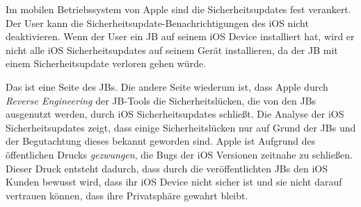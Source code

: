  Im mobilen Betriebssystem von Apple sind die Sicherheitsupdates fest verankert. Der User kann die Sicherheitsupdate-Benachrichtigungen des iOS nicht deaktivieren. Wenn der User ein JB auf seinem iOS Device installiert hat, wird er nicht alle iOS Sicherheitsupdates auf seinem Gerät installieren, da der JB mit einem Sicherheitsupdate verloren gehen würde.\par 
Das ist eine Seite des JBs. Die andere Seite wiederum ist, dass Apple durch \textit{\glqq Reverse Engineering\grqq{}} der JB-Tools die Sicherheitslücken, die von den JBs ausgenutzt werden, durch iOS Sicherheitsupdates schließt. Die Analyse der iOS Sicherheitsupdates zeigt, dass einige Sicherheitslücken nur auf Grund der JBs und der Begutachtung dieses bekannt geworden sind. Apple ist Aufgrund des öffentlichen Drucks \textit{\glqq gezwungen\grqq{}}, die Bugs der iOS Versionen zeitnahe zu schließen. Dieser Druck entsteht dadurch, dass durch die veröffentlichten JBs den iOS Kunden bewusst wird, dass ihr iOS Device nicht sicher ist und sie nicht darauf vertrauen können, dass ihre Privatsphäre gewahrt bleibt.



